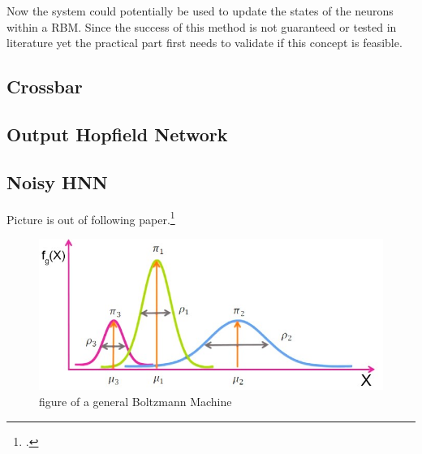 Now the system could potentially be used to update the states of the neurons within a \ac{RBM}.
Since the success of this method is not guaranteed or tested in literature yet the practical part first needs to validate if this concept is feasible.

\subsection{Crossbar}
\subsection{Output Hopfield Network}
\subsection{Noisy HNN}

Picture is out of following paper.\footcite[cf.][3]{gmComprehensiveSurveyAnalysis2020}
\begin{figure}[H]
    \centering
    \includegraphics[width=0.7\linewidth]{graphics/Gaussian_Normal_Distribution_edited.jpg}
    \caption{figure of a general Boltzmann Machine}
    \label{fig2}
\end{figure}
